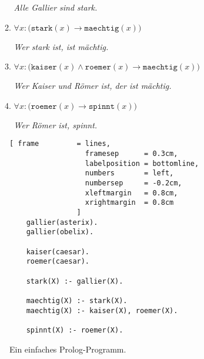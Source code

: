 \begin{enumerate}
\begin{enumerate}
            \textsl{Alle Gallier sind stark.}
      \item $\forall x : \bigl(\texttt{stark}(x) \rightarrow \texttt{maechtig}(x)\bigr)$

            \textsl{Wer stark ist, ist m\"{a}chtig.}
      \item $\forall x : \bigl(\texttt{kaiser}(x) \wedge \texttt{roemer}(x) \rightarrow \texttt{maechtig}(x)\bigr)$

            \textsl{Wer Kaiser und R\"{o}mer ist, der ist m\"{a}chtig.}
      \item $\forall x : \bigl(\texttt{roemer}(x) \rightarrow \texttt{spinnt}(x)\bigr)$

            \textsl{Wer R\"{o}mer ist, spinnt.}
      \end{enumerate}
\end{enumerate}

\begin{figure}[!h]
  \centering
\begin{Verbatim}[ frame         = lines, 
                  framesep      = 0.3cm, 
                  labelposition = bottomline,
                  numbers       = left,
                  numbersep     = -0.2cm,
                  xleftmargin   = 0.8cm,
                  xrightmargin  = 0.8cm
                ]
    gallier(asterix).
    gallier(obelix).

    kaiser(caesar).
    roemer(caesar).

    stark(X) :- gallier(X).

    maechtig(X) :- stark(X).
    maechtig(X) :- kaiser(X), roemer(X).

    spinnt(X) :- roemer(X).
\end{Verbatim}
\vspace*{-0.3cm}
  \caption{Ein einfaches Prolog-Programm.}
  \label{fig:caesar}
\end{figure}

